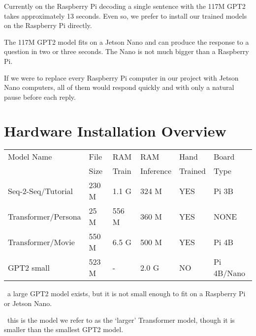 Currently on the Raspberry Pi decoding a single sentence with the 117M GPT2 takes approximately 13 seconds. Even so, we prefer to install our trained models on the Raspberry Pi directly.

The 117M GPT2 model fits on a Jetson Nano and can produce the response to a question in two or three seconds. The Nano is not much bigger than a Raspberry Pi.

If we were to replace every Raspberry Pi computer in our project with Jetson Nano computers, all of them would respond quickly and with only a natural pause before each reply.

\section{Hardware Installation Overview}



\begin{table}[h]
	
	\begin{center}
		
		
		\begin{tabular}{llllll}
			
			Model Name    & File  & RAM  & RAM    & Hand & Board \\
			&  Size & Train   & Inference    & Trained &   Type \\
			\hline
			\hline
			Seq-2-Seq/Tutorial & 230 M     & 1.1 G & 324 M             & YES  &  Pi 3B \\
			Transformer/Persona   & 25 M      & 556 M & 360 M          & YES  & NONE \\
			Transformer/Movie \dag \dag  & 550 M      & 6.5 G & 500 M  & YES    & Pi 4B  \\
			GPT2 small \dag   & 523 M     & -   & 2.0 G         & NO     &  Pi 4B/Nano \\
			\hline
		\end{tabular}
		
		\bigskip
	\end{center}
		\dag \ a large GPT2 model exists, but it is not small enough to fit on a Raspberry Pi or Jetson Nano.
		
		\dag \dag \ this is the model we refer to as the `larger' Transformer model, though it is smaller than the smallest GPT2 model.
		
	
	\label{fig:modeloverview}
\end{table}


